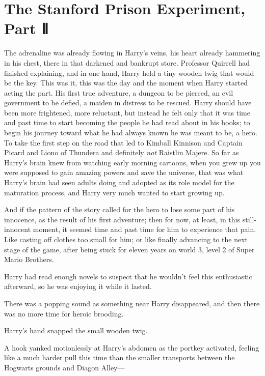 \chapter{The Stanford Prison Experiment, Part
Ⅱ}\label{the-stanford-prison-experiment-part}

The adrenaline was already flowing in Harry's veins, his heart already
hammering in his chest, there in that darkened and bankrupt store.
Professor Quirrell had finished explaining, and in one hand, Harry held
a tiny wooden twig that would be the key. This was it, this was the day
and the moment when Harry started acting the part. His first true
adventure, a dungeon to be pierced, an evil government to be defied, a
maiden in distress to be rescued. Harry should have been more
frightened, more reluctant, but instead he felt only that it was time
and past time to start becoming the people he had read about in his
books; to begin his journey toward what he had always known he was meant
to be, a hero. To take the first step on the road that led to Kimball
Kinnison and Captain Picard and Liono of Thundera and definitely
\emph{not} Raistlin Majere. So far as Harry's brain knew from watching
early morning cartoons, when you grew up you were supposed to gain
amazing powers and save the universe, that was what Harry's brain had
seen adults doing and adopted as its role model for the maturation
process, and Harry very much wanted to start growing up.

And if the pattern of the story called for the hero to lose some part of
his innocence, as the result of his first adventure; then for now, at
least, in this still-innocent moment, it seemed time and past time for
him to experience that pain. Like casting off clothes too small for him;
or like finally advancing to the next stage of the game, after being
stuck for eleven years on world 3, level 2 of Super Mario Brothers.

Harry had read enough novels to suspect that he wouldn't feel this
enthusiastic afterward, so he was enjoying it while it lasted.

There was a popping sound as something near Harry disappeared, and then
there was no more time for heroic brooding.

Harry's hand snapped the small wooden twig.

A hook yanked motionlessly at Harry's abdomen as the portkey activated,
feeling like a much harder pull this time than the smaller transports
between the Hogwarts grounds and Diagon Alley---

